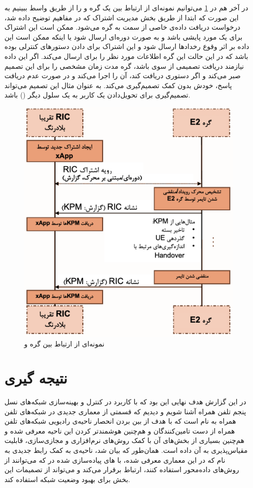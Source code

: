 \documentclass{CSICC}
\begin{document}
در آخر هم در 
\ref{fig:sample}
می‌توانیم نمونه‌ای از ارتباط بین یک گره‌
و
را از طریق واسط
ببینیم به این صورت که ابتدا از طریق بخش مدیریت اشتراک که در مفاهیم توضیح داده شد، درخواست دریافت داده‌ی خاصی از سمت 
به گره
می‌شود. ممکن است این اشتراک برای یک مورد پایشی باشد و به صورت دوره‌ای ارسال شود یا اینکه ممکن است این داده بر اثر وقوع رخدادها ارسال شود و این اشتراک برای دادن دستورهای کنترلی بوده باشد که در این حالت این گره اطلاعات مورد نظر را برای 
ارسال می‌کند. اگر این داده نیازمند دریافت تصمیمی از سوی 
باشد، گره
مدت زمان مشخصی را برای این تصمیم صبر می‌کند و اگر دستوری دریافت کند، آن را اجرا می‌کند و در صورت عدم دریافت پاسخ، خودش بدون کمک 
تصمیم‌گیری می‌کند. به عنوان مثال این تصمیم می‌تواند تصمیم‌گیری برای تحویل‌دادن یک کاربر به یک سلول دیگر
()
باشد.

\begin{figure}
	\includegraphics[width=0.6\linewidth]{Images/sample.png}
	\centering
	\caption{نمونه‌ای از ارتباط بین گره
و
}
	\label{fig:sample}
\end{figure}


\section{نتیجه گیری}

در این گزارش هدف نهایی این بود که با کاربرد 
در کنترل و بهینه‌سازی شبکه‌های نسل پنجم تلفن همراه آشنا شویم و دیدیم که 
قسمتی از معماری جدیدی در شبکه‌های تلفن همراه به نام
است که با هدف از بین بردن انحصار ناحیه‌ی رادیویی شبکه‌های تلفن همراه از دست تامین‌کنندگان و هم‌چنین هوشمند‌تر کردن این ناحیه معرفی شده و هم‌چنین بسیاری از بخش‌های آن با کمک روش‌های نرم‌افزاری و مجازی‌سازی، قابلیت مقیاس‌پذیری به آن داده است. همان‌طور که بیان شد، ناحیه‌ی 
به کمک رابط‌ جدیدی به نام
که در این معماری معرفی شده، با 
های 
پیاده‌سازی شده در 
که می‌توانند از روش‌های داده‌محور استفاده کنند، ارتباط برقرار می‌کند و می‌‌تواند از تصمیمات این بخش برای بهبود وضعیت شبکه استفاده کند. 



\theendnotes
\end{document}
